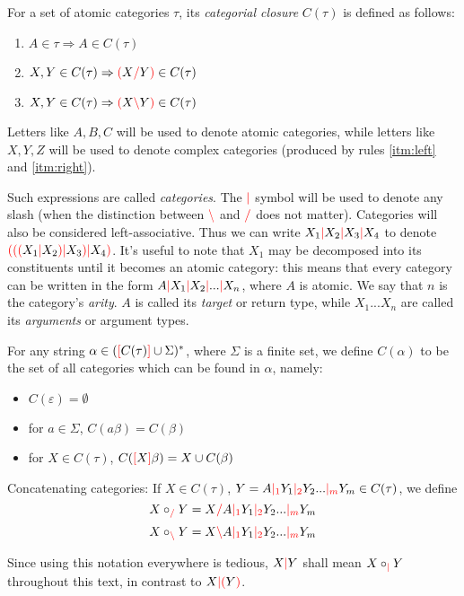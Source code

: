 \documentclass[main.tex]{subfiles}
\begin{document}
\begin{defn}
    For a set of atomic categories $\tau$, its
    \emph{categorial closure} $C(\tau)$ is defined as follows:
    \begin{enumerate}
        \item \label{itm:atomic} $A \in \tau \Rightarrow A \in C(\tau)$
        \item \label{itm:right}  $X, Y \in C(\tau) \Rightarrow \textcolor{red}{(} X \textcolor{red}{/} Y \textcolor{red}{)} \in C(\tau)$
        \item \label{itm:left}   $X, Y \in C(\tau) \Rightarrow \textcolor{red}{(} X \textcolor{red}{\backslash} Y \textcolor{red}{)} \in C(\tau)$
    \end{enumerate}

    Letters like $A, B, C$ will be used to denote atomic categories,
    while letters like $X, Y, Z$ will be used to
    denote complex categories (produced by rules \ref{itm:left} and \ref{itm:right}).

    Such expressions are called \emph{categories}. The $\textcolor{red}{|}$ symbol will be
    used to denote any slash (when the distinction between $\textcolor{red}{\backslash}$ and $\textcolor{red}{/}$
    does not matter). Categories will also be considered left-associative.
    Thus we can write $X_1 \textcolor{red}{|} X_2 \textcolor{red}{|} X_3 \textcolor{red}{|} X_4$ to denote
    $\textcolor{red}{(} \textcolor{red}{(} \textcolor{red}{(} X_1 \textcolor{red}{|} X_2 \textcolor{red}{)} \textcolor{red}{|} X_3 \textcolor{red}{)} \textcolor{red}{|} X_4 \textcolor{red}{)}$. It's useful to note that $X_1$ may
    be decomposed into its constituents until it becomes an atomic category:
    this means that every category can be written in the form
    $A \textcolor{red}{|} X_1 \textcolor{red}{|} X_2 \textcolor{red}{|} ... \textcolor{red}{|} X_n$, where $A$ is atomic. We say that
    $n$ is the category's \emph{arity}. $A$ is called its \emph{target} or
    return type, while
    $X_1 ... X_n$ are called its \emph{arguments} or argument types.

    For any string $\alpha \in (\textcolor{red}{[} C(\tau) \textcolor{red}{]} \cup \Sigma)^*$, where $\Sigma$ is a
    finite set, we define $C(\alpha)$ to be the set of all categories which
    can be found in $\alpha$, namely:
    \begin{itemize}
        \item $C(\varepsilon) = \emptyset$
        \item for $a \in \Sigma$, $C(a\beta) = C(\beta)$
        \item for $X \in C(\tau)$, $C(\textcolor{red}{[} X \textcolor{red}{]} \beta) = X \cup C(\beta)$
    \end{itemize}
\end{defn}

\begin{defn}
    Concatenating categories: If $X \in C(\tau)$,
    $Y = A \textcolor{red}{|_{1}} Y_1 \textcolor{red}{|_{2}} Y_2 ... \textcolor{red}{|_{m}} Y_m \in C(\tau)$, we define
    \[ X \circ_{\textcolor{red}{/}} Y = X \textcolor{red}{/} A \textcolor{red}{|_{1}} Y_1 \textcolor{red}{|_{2}} Y_2 ... \textcolor{red}{|_{m}} Y_m \]
    \[ X \circ_{\textcolor{red}{\backslash}} Y = X \textcolor{red}{\backslash} A \textcolor{red}{|_{1}} Y_1 \textcolor{red}{|_{2}} Y_2 ... \textcolor{red}{|_{m}} Y_m \]

    Since using this notation everywhere is tedious, $X \textcolor{red}{|} Y$ shall mean
    $X \circ_{\textcolor{red}{|}} Y$ throughout this text, in contrast to
    $X \textcolor{red}{|} \textcolor{red}{(} Y \textcolor{red}{)}$.
\end{defn}
\end{document}
